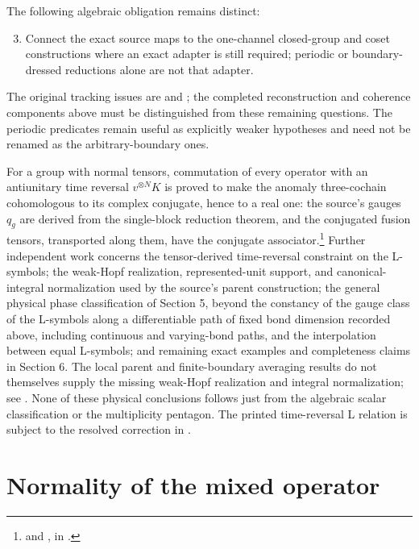 \documentclass{article}
\begin{document}
The following algebraic obligation remains distinct:
\begin{enumerate}
    \setcounter{enumi}{2}
    \item Connect the exact source maps to the one-channel closed-group and
          coset constructions where an exact adapter is still required;
          periodic or boundary-dressed reductions alone are not that adapter.
\end{enumerate}
The original tracking issues are  and ; the
completed reconstruction and coherence components above must be
distinguished from these remaining questions. The periodic predicates
remain useful as explicitly weaker hypotheses and need not be renamed as
the arbitrary-boundary ones.

For a group with normal tensors, commutation of every operator with an
antiunitary time reversal $v^{\otimes N}K$ is proved to make the anomaly
three-cochain cohomologous to its complex conjugate, hence to a real one:
the source's gauges $q_g$ are derived from the single-block reduction
theorem, and the conjugated fusion tensors, transported along them, have
the conjugate associator.\footnote{
     and
    ,
    in .}
Further independent work concerns the tensor-derived time-reversal
constraint on the L-symbols;
the weak-Hopf realization, represented-unit support, and canonical-integral
normalization used by the source's parent construction; the general physical
phase classification of Section 5, beyond the constancy of the gauge class
of the L-symbols along a differentiable path of fixed bond dimension
recorded above, including continuous and varying-bond paths, and the interpolation between equal
L-symbols; and remaining exact examples and completeness claims in Section 6.
The local parent and finite-boundary averaging results do not themselves
supply the missing weak-Hopf realization and integral normalization; see
.
None of these physical conclusions follows just from the algebraic scalar
classification or the multiplicity pentagon. The printed time-reversal L
relation is subject to the resolved correction in
.

\section{Normality of the mixed operator}
\end{document}
